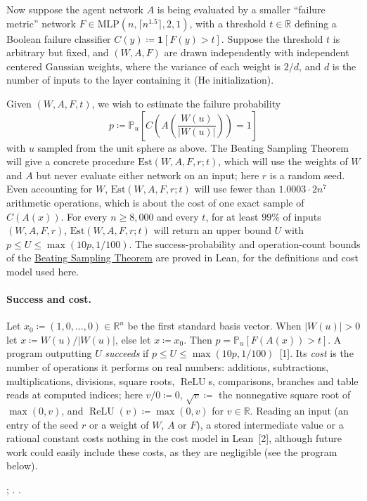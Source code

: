 \documentclass[10pt]{article}
\newcommand{\leanver}{v1.1}
\newcommand{\leanrepo}{https://github.com/andrewcritch/beating-sampling-theorem/tree/\leanver/lean/BstLean}
\newcommand{\leanmark}[1]{{\relscale{0.78}\color{gray}[#1]}}
\newenvironment{leanitems}{\par\smallskip\relscale{0.78}\color{gray}\hypersetup{urlcolor=gray}\raggedright%
  \begin{list}{}{\setlength{\leftmargin}{2em}\setlength{\labelwidth}{1.6em}%
  \setlength{\labelsep}{0.4em}\setlength{\itemsep}{0pt}\setlength{\topsep}{0pt}%
  \setlength{\parsep}{0pt}}}{\end{list}\par\medskip}
\newcommand{\bst}{\hyperref[thm:main]{Beating Sampling Theorem}}
\newcommand{\RR}{\mathbb{R}}
\newcommand{\Est}{\mathrm{Est}}
\newcommand{\PP}{\mathbb{P}}
\newcommand{\relu}{\operatorname{ReLU}}
\begin{document}
Now suppose the agent network $A$ is being evaluated by a smaller ``failure metric'' network $F\in\mathrm{MLP}(n,\lceil n^{1.5}\rceil,2,1)$, with a threshold $t\in\RR$ defining a Boolean failure classifier $C(y)\coloneqq \mathbf 1[F(y)>t]$. Suppose the threshold $t$ is arbitrary but fixed, and $(W,A,F)$ are drawn independently with independent centered Gaussian weights, where the variance of each weight is $2/d$, and $d$ is the number of inputs to the layer containing it (He initialization).

Given $(W,A,F,t)$, we wish to estimate the failure probability 
\[p\coloneqq \PP_u\left[C\left(A\left(\frac{W(u)}{|W(u)|}\right)\right)=1\right]\]
with $u$ sampled from the unit sphere as above. The Beating Sampling Theorem will give a concrete procedure $\Est(W,A,F,r;t)$, which will use the weights of $W$ and $A$ but never evaluate either network on an input; here $r$ is a random seed. Even accounting for $W$, $\Est(W,A,F,r;t)$ will use fewer than $1.0003\cdot2n^7$ arithmetic operations, which is about the cost of one exact sample of $C(A(x))$. For every $n\ge8{,}000$ and every $t$, for at least $99\%$ of inputs $(W,A,F,r)$, $\Est(W,A,F,r;t)$ will return an upper bound $U$ with $p\le U\le\max(10p,1/100)$. The success-probability and operation-count bounds of the \bst{} are proved in Lean, for the definitions and cost model used here.

\paragraph{Success and cost.}
Let $x_0\coloneqq(1,0,\dots,0)\in\RR^n$ be the first standard basis vector. When $|W(u)|>0$ let
$x\coloneqq W(u)/|W(u)|$, else let $x\coloneqq x_0$. Then $p=\PP_u[F(A(x))>t]$. A program
outputting $U$ \emph{succeeds} if $p\le U\le\max(10p,1/100)$~\leanmark{1}. Its \emph{cost} is the
number of operations it performs on real numbers: additions, subtractions,
multiplications, divisions, square roots, $\relu$s, comparisons, branches and
table reads at computed indices; here $v/0\coloneqq0$, $\sqrt v\coloneqq$ the nonnegative square
root of $\max(0,v)$, and $\relu(v)\coloneqq\max(0,v)$ for $v\in\RR$. Reading an input (an entry of the seed $r$ or a weight of $W$, $A$ or $F$), a stored intermediate value or a rational constant costs nothing in the cost model in Lean~\leanmark{2}, although future work could easily include these costs, as they are negligible (see the program below).
\begin{leanitems}
; \href{\leanrepo}{\leanstepA}.
.
\end{leanitems}
\end{document}
